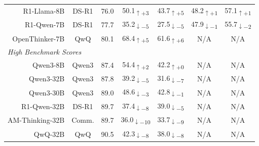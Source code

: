\documentclass{article} %
\begin{document}
\begin{table}[t]
\begin{tabular}{r|c|c|cc|cc}
    R1-Llama-8B       & DS-R1 & 76.0 &
    \cellcolor{green!13}50.1\textsubscript{$\uparrow+3$} &
    \cellcolor{green!15}43.7\textsubscript{$\uparrow+5$} &
    \cellcolor{green!11}48.2\textsubscript{$\uparrow+1$} &
    \cellcolor{green!11}57.1\textsubscript{$\uparrow+1$} \\
    
    R1-Qwen-7B        & DS-R1 & 77.7 &
    \cellcolor{red!15}35.2\textsubscript{$\downarrow-5$} &
    \cellcolor{red!15}27.5\textsubscript{$\downarrow-5$} &
    \cellcolor{red!11}47.9\textsubscript{$\downarrow-1$} &
    \cellcolor{red!12}55.7\textsubscript{$\downarrow-2$} \\
    
    OpenThinker-7B    & QwQ   & 80.1 &
    \cellcolor{green!15}68.4\textsubscript{$\uparrow+5$} &
    \cellcolor{green!16}61.6\textsubscript{$\uparrow+6$} &
    N/A & N/A \\
    
    \midrule
    \multicolumn{7}{l}{\textit{High Benchmark Scores}} \\
    \midrule
    
    Qwen3-8B          & Qwen3 & 87.4 &
    \cellcolor{green!12}54.4\textsubscript{$\uparrow+2$} &
    \cellcolor{green!0}42.2\textsubscript{$\uparrow+0$} &
    N/A & N/A \\
    
    Qwen3-32B         & Qwen3 & 87.8 &
    \cellcolor{red!15}39.2\textsubscript{$\downarrow-5$} &
    \cellcolor{red!27}31.6\textsubscript{$\downarrow-7$} &
    N/A & N/A \\
    
    Qwen3-30B         & Qwen3 & 89.0 &
    \cellcolor{red!13}48.6\textsubscript{$\downarrow-3$} &
    \cellcolor{red!11}42.8\textsubscript{$\downarrow-1$} &
    N/A & N/A \\
    
    R1-Qwen-32B       & DS-R1 & 89.7 &
    \cellcolor{red!28}37.4\textsubscript{$\downarrow-8$} &
    \cellcolor{red!15}39.0\textsubscript{$\downarrow-5$} &
    N/A & N/A \\
    
    AM-Thinking-32B   & Comm. & 89.7 &
    \cellcolor{red!33}36.0\textsubscript{$\downarrow-10$} &
    \cellcolor{red!29}33.7\textsubscript{$\downarrow-9$} &
    N/A & N/A \\
    
    QwQ-32B           & QwQ   & 90.5 &
    \cellcolor{red!28}42.3\textsubscript{$\downarrow-8$} &
    \cellcolor{red!28}38.0\textsubscript{$\downarrow-8$} &
    N/A & N/A \\
    

\end{tabular}
\end{table}
\end{document}
